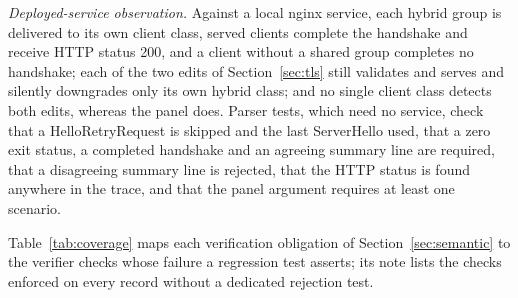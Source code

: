 \emph{Deployed-service observation.} Against a local nginx service, each hybrid group is delivered to its own client class, served clients complete the handshake and receive HTTP status 200, and a client without a shared group completes no handshake; each of the two edits of Section~\ref{sec:tls} still validates and serves and silently downgrades only its own hybrid class; and no single client class detects both edits, whereas the panel does. Parser tests, which need no service, check that a HelloRetryRequest is skipped and the last ServerHello used, that a zero exit status, a completed handshake and an agreeing summary line are required, that a disagreeing summary line is rejected, that the HTTP status is found anywhere in the trace, and that the panel argument requires at least one scenario.

Table~\ref{tab:coverage} maps each verification obligation of Section~\ref{sec:semantic} to the verifier checks whose failure a regression test asserts; its note lists the checks enforced on every record without a dedicated rejection test.

